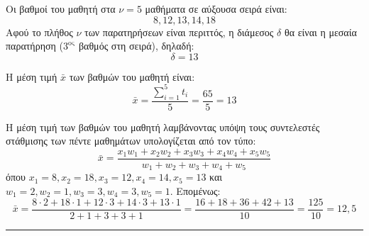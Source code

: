 
\begin{alist}
    \item Οι βαθμοί του μαθητή στα $ν = 5$ μαθήματα σε αύξουσα σειρά είναι:
    \[ 8, 12, 13, 14, 18 \]
    Αφού το πλήθος $ν$ των παρατηρήσεων είναι περιττός, η διάμεσος $δ$ θα είναι η μεσαία παρατήρηση ($3^{\text{ος}}$ βαθμός στη σειρά), δηλαδή:
    \[ δ = 13 \]
    
    \item Η μέση τιμή $\bar{x}$ των βαθμών του μαθητή είναι:
    \[ \bar{x} = \frac{\sum_{i=1}^{5} t_i}{5} = \frac{65}{5} = 13 \]
    
    \item Η μέση τιμή των βαθμών του μαθητή λαμβάνοντας υπόψη τους συντελεστές στάθμισης των πέντε μαθημάτων υπολογίζεται από τον τύπο:
    \[ \bar{x} = \frac{x_1 w_1 + x_2 w_2 + x_3 w_3 + x_4 w_4 + x_5 w_5}{w_1 + w_2 + w_3 + w_4 + w_5} \]
    όπου $x_1 = 8, x_2 = 18, x_3 = 12, x_4 = 14, x_5 = 13$ και $w_1 = 2, w_2 = 1, w_3 = 3, w_4 = 3, w_5 = 1$. Επομένως:
    \[ \bar{x} = \frac{8 \cdot 2 + 18 \cdot 1 + 12 \cdot 3 + 14 \cdot 3 + 13 \cdot 1}{2 + 1 + 3 + 3 + 1} = \frac{16 + 18 + 36 + 42 + 13}{10} = \frac{125}{10} = 12,5 \]
\end{alist}
\vspace{6mm}
\noindent\rule{\textwidth}{0.4pt}
\vspace{6mm}


